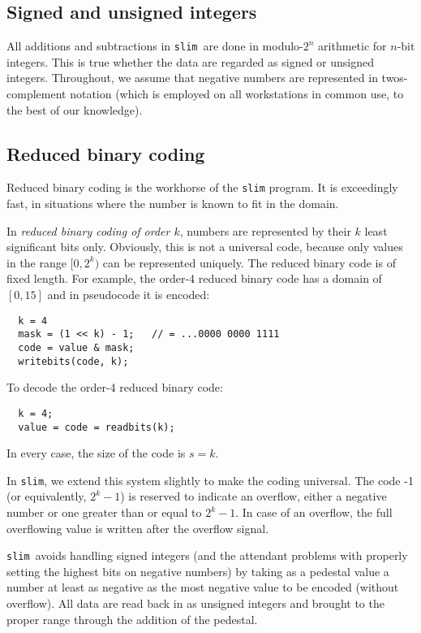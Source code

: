 \documentclass[11pt]{article}
\newcommand{\slim}{{\tt slim}}
\begin{document}
\subsection{Signed and unsigned integers}

All additions and subtractions in \slim\ are done in modulo-$2^{n}$
arithmetic for $n$-bit integers.  This is true whether the data are
regarded as signed or unsigned integers.  Throughout, we assume that
negative numbers are represented in twos-complement notation (which is
employed on all workstations in common use, to the best of our
knowledge).


\subsection{Reduced binary coding  \label{sec:reduced}}

Reduced binary coding is the workhorse of the {\tt slim} program.  It
is exceedingly fast, in situations where the number is known to fit in
the domain.

In \emph{reduced binary coding of order $k$}, numbers are represented
by their $k$ least significant bits only.  Obviously, this is not a
universal code, because only values in the range $[0,2^k)$ can be
represented uniquely.  The reduced binary code is of fixed length.
For example, the order-4 reduced binary code has a domain of
$[0,15]$ and in pseudocode it is encoded:
\begin{verbatim} 
  k = 4
  mask = (1 << k) - 1;   // = ...0000 0000 1111
  code = value & mask;
  writebits(code, k);
\end{verbatim}

To decode the order-4 reduced binary code:
\begin{verbatim}
  k = 4;
  value = code = readbits(k);
\end{verbatim}
In every case, the size of the code is $s = k$.

In \slim, we extend this system slightly to make the coding universal.
The code -1 (or equivalently, $2^k-1$) is reserved to indicate an
overflow, either a negative number or one greater than or equal to
$2^k-1$.  In case of an overflow, the full overflowing value is
written after the overflow signal.

\slim\ avoids handling signed integers (and the attendant problems with
properly setting the highest bits on negative numbers) by taking as a
pedestal value a number at least as negative as the most negative
value to be encoded (without overflow).  All data are read back in as
unsigned integers and brought to the proper range through the addition
of the pedestal.
\end{document}
